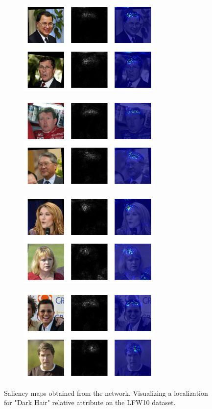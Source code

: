 \documentclass[10pt,twocolumn,letterpaper]{article}
\begin{document}
\begin{figure}
    \centering
    \begin{subfigure}
        \centering
        \includegraphics[width=7cm]{saliency-new/LFW/darkhair-1}
    \end{subfigure}
    \begin{subfigure}
        \centering
        \includegraphics[width=7cm]{saliency-new/LFW/darkhair-2}
    \end{subfigure}
    \begin{subfigure}
        \centering
        \includegraphics[width=7cm]{saliency-new/LFW/darkhair-4}
    \end{subfigure}
    \begin{subfigure}
        \centering
        \includegraphics[width=7cm]{saliency-new/LFW/darkhair-6}
    \end{subfigure}
    
    \caption{Saliency maps obtained from the network. Visualizing a localization for "Dark Hair" relative attribute on the LFW10 dataset.}
    \label{sal.lfw.harkhair}
\end{figure}
\end{document}
